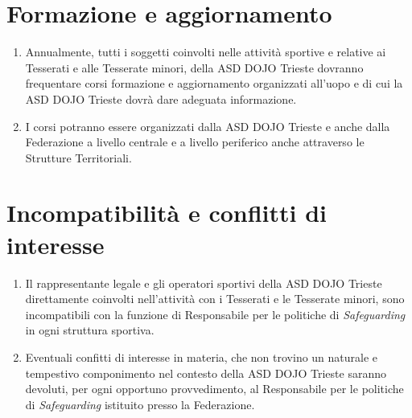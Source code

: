 \documentclass{djtsdoc}
\begin{document}
	\section{Formazione e aggiornamento}
	\begin{enumerate}
		\item Annualmente, tutti i soggetti coinvolti nelle attività sportive e relative ai Tesserati e alle Tesserate minori, della ASD DOJO Trieste dovranno frequentare corsi formazione e aggiornamento organizzati all'uopo e di cui la ASD DOJO Trieste dovrà dare adeguata informazione.
		\item I corsi potranno essere organizzati dalla ASD DOJO Trieste e anche dalla Federazione a livello centrale e a livello periferico anche attraverso le Strutture Territoriali.
	\end{enumerate}
	
	\section{Incompatibilità e conflitti di interesse}
	\begin{enumerate}
		\item Il rappresentante legale e gli operatori sportivi della ASD DOJO Trieste direttamente coinvolti nell'attività con i Tesserati e le Tesserate minori, sono incompatibili con la funzione di Responsabile per le politiche di \textit{Safeguarding} in ogni struttura sportiva.
		\item Eventuali confitti di interesse in materia, che non trovino un naturale e tempestivo componimento nel contesto della ASD DOJO Trieste saranno devoluti, per ogni opportuno provvedimento, al Responsabile per le politiche di \textit{Safeguarding} istituito presso la Federazione.
	\end{enumerate}
	
\end{document}
